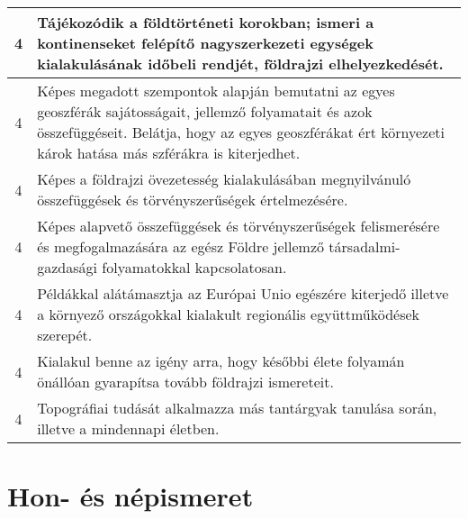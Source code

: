 \begin{longtable}{c | p{12cm} }
                                
                                          4 &  Tájékozódik a földtörténeti korokban; ismeri a kontinenseket felépítő nagyszerkezeti egységek kialakulásának időbeli rendjét, földrajzi elhelyezkedését. \\ \hline
                                          4 &  Képes megadott szempontok alapján bemutatni az egyes geoszférák sajátosságait, jellemző folyamatait és azok összefüggéseit. Belátja, hogy az egyes geoszférákat ért környezeti károk hatása más szférákra is kiterjedhet. \\ \hline
                                          4 &  Képes a földrajzi övezetesség kialakulásában megnyilvánuló összefüggések és törvényszerűségek értelmezésére. \\ \hline
                                          4 &  Képes alapvető összefüggések és törvényszerűségek felismerésére és megfogalmazására az egész Földre jellemző társadalmi-gazdasági folyamatokkal kapcsolatosan. \\ \hline
                                          4 &  Példákkal alátámasztja az Európai Unio egészére kiterjedő illetve a környező országokkal kialakult regionális együttműködések szerepét. \\ \hline
                                          4 &  Kialakul benne az igény arra, hogy későbbi élete folyamán önállóan gyarapítsa tovább földrajzi ismereteit. \\ \hline
                                          4 &  Topográfiai tudását alkalmazza más tantárgyak tanulása során, illetve a mindennapi életben. \\ \hline
                                      
                        \end{longtable}
            \clearpage

        \section{Hon- és népismeret}

